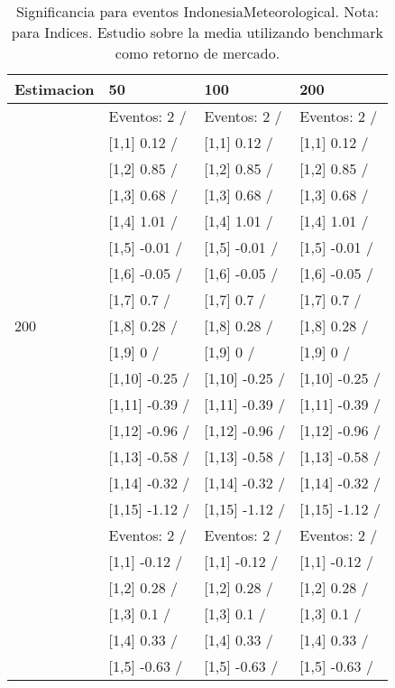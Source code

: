 \begin{table}

\caption{Significancia para eventos IndonesiaMeteorological. Nota: para Indices. Estudio sobre la media utilizando benchmark como retorno de mercado.}
\centering
\begin{tabular}[t]{llll}
\toprule
Estimacion & 50 & 100 & 200\\
\midrule
 & Eventos:  2 / & Eventos:  2 / & Eventos:  2 /\\
 & {}[1,1] 0.12  / & {}[1,1] 0.12  / & {}[1,1] 0.12  /\\
 & {}[1,2] 0.85  / & {}[1,2] 0.85  / & {}[1,2] 0.85  /\\
 & {}[1,3] 0.68  / & {}[1,3] 0.68  / & {}[1,3] 0.68  /\\
 & {}[1,4] 1.01  / & {}[1,4] 1.01  / & {}[1,4] 1.01  /\\
\addlinespace
 & {}[1,5] -0.01  / & {}[1,5] -0.01  / & {}[1,5] -0.01  /\\
 & {}[1,6] -0.05  / & {}[1,6] -0.05  / & {}[1,6] -0.05  /\\
 & {}[1,7] 0.7  / & {}[1,7] 0.7  / & {}[1,7] 0.7  /\\
200 & {}[1,8] 0.28  / & {}[1,8] 0.28  / & {}[1,8] 0.28  /\\
 & {}[1,9] 0  / & {}[1,9] 0  / & {}[1,9] 0  /\\
\addlinespace
 & {}[1,10] -0.25  / & {}[1,10] -0.25  / & {}[1,10] -0.25  /\\
 & {}[1,11] -0.39  / & {}[1,11] -0.39  / & {}[1,11] -0.39  /\\
 & {}[1,12] -0.96  / & {}[1,12] -0.96  / & {}[1,12] -0.96  /\\
 & {}[1,13] -0.58  / & {}[1,13] -0.58  / & {}[1,13] -0.58  /\\
 & {}[1,14] -0.32  / & {}[1,14] -0.32  / & {}[1,14] -0.32  /\\
\addlinespace
 & {}[1,15] -1.12  / & {}[1,15] -1.12  / & {}[1,15] -1.12  /\\
 & Eventos:  2 / & Eventos:  2 / & Eventos:  2 /\\
 & {}[1,1] -0.12  / & {}[1,1] -0.12  / & {}[1,1] -0.12  /\\
 & {}[1,2] 0.28  / & {}[1,2] 0.28  / & {}[1,2] 0.28  /\\
 & {}[1,3] 0.1  / & {}[1,3] 0.1  / & {}[1,3] 0.1  /\\
\addlinespace
 & {}[1,4] 0.33  / & {}[1,4] 0.33  / & {}[1,4] 0.33  /\\
 & {}[1,5] -0.63  / & {}[1,5] -0.63  / & {}[1,5] -0.63  /\\

\end{tabular}
\end{table}
